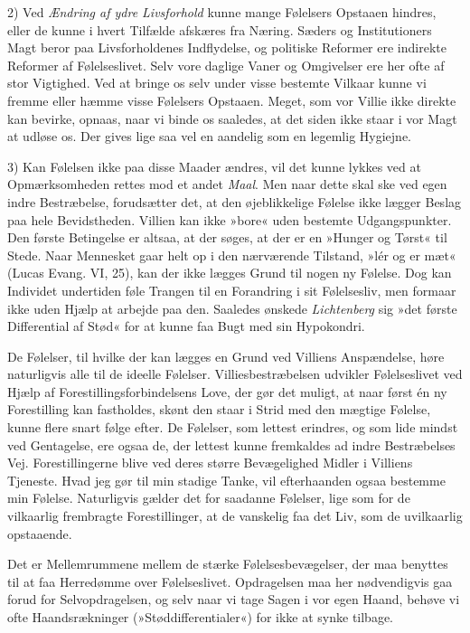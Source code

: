 \documentclass[12pt,a4paper,openany]{book}
\newcommand{\opage}[1]{\marginnote{\footnotesize\textit{[#1]}}}
\begin{document}
2) Ved \emph{Ændring af ydre Livsforhold} kunne mange Følelsers Opstaaen
hindres, eller de kunne i hvert Tilfælde afskæres fra Næring. Sæders og
Institutioners Magt beror paa Livsforholdenes Indflydelse, og politiske
Reformer ere indirekte Reformer af Følelseslivet. Selv vore daglige
Vaner og Omgivelser ere her ofte af stor Vigtighed. Ved at bringe os
selv under visse bestemte Vilkaar kunne vi fremme eller hæmme visse
Følelsers Opstaaen. Meget, som vor Villie ikke direkte kan bevirke,
opnaas, naar vi binde os saaledes, at det siden ikke staar i vor Magt at
udløse os. Der gives lige saa vel en aandelig som en legemlig Hygiejne.


\opage{389}3) Kan Følelsen ikke paa disse Maader ændres, vil det kunne
lykkes ved at Opmærksomheden rettes mod et andet \emph{Maal}. Men naar
dette skal ske ved egen indre Bestræbelse, forudsætter det, at den
øjeblikkelige Følelse ikke lægger Beslag paa hele Bevidstheden. Villien
kan ikke »bore« uden bestemte Udgangspunkter. Den første Betingelse er
altsaa, at der søges, at der er en »Hunger og Tørst« til Stede. Naar
Mennesket gaar helt op i den nærværende Tilstand, »lér og er mæt« (Lucas
Evang. VI, 25), kan der ikke lægges Grund til nogen ny Følelse. Dog kan
Individet undertiden føle Trangen til en Forandring i sit Følelsesliv,
men formaar ikke uden Hjælp at arbejde paa den. Saaledes ønskede
\emph{Lichtenberg} sig »det første Differential af Stød« for at kunne
faa Bugt med sin Hypokondri.

De Følelser, til hvilke der kan lægges en Grund ved Villiens
Anspændelse, høre naturligvis alle til de ideelle Følelser.
Villiesbestræbelsen udvikler Følelseslivet ved Hjælp af
Forestillingsforbindelsens Love, der gør det muligt, at naar først én ny
Forestilling kan fastholdes, skønt den staar i Strid med den mægtige
Følelse, kunne flere snart følge efter. De Følelser, som lettest
erindres, og som lide mindst ved Gentagelse, ere ogsaa de, der lettest
kunne fremkaldes ad indre Bestræbelses Vej. Forestillingerne blive ved
deres større Bevægelighed Midler i Villiens Tjeneste. Hvad jeg gør til
min stadige Tanke, vil efterhaanden ogsaa bestemme min Følelse.
Naturligvis gælder det for saadanne Følelser, lige som for de vilkaarlig
frembragte Forestillinger, at de vanskelig faa det Liv, som de
uvilkaarlig opstaaende.

Det er Mellemrummene mellem de stærke Følelsesbevægelser, der maa
benyttes til at faa Herredømme over Følelseslivet. Opdragelsen maa her
nødvendigvis gaa forud for Selvopdragelsen, og selv naar vi tage Sagen i
vor egen Haand, behøve vi ofte Haandsrækninger (»Støddifferentialer«)
for ikke at synke tilbage.
\end{document}
